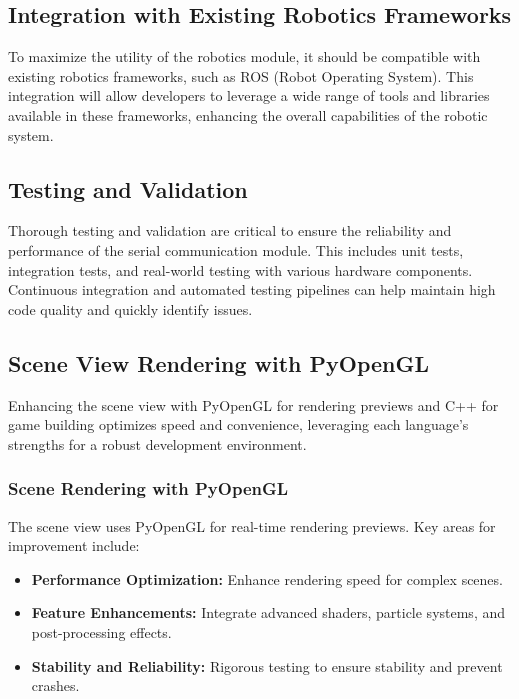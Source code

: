 \subsection*{Integration with Existing Robotics Frameworks}

To maximize the utility of the robotics module, it should be compatible with existing robotics frameworks, such as ROS (Robot Operating System). This integration will allow developers to leverage a wide range of tools and libraries available in these frameworks, enhancing the overall capabilities of the robotic system.


\subsection*{Testing and Validation}

Thorough testing and validation are critical to ensure the reliability and performance of the serial communication module. This includes unit tests, integration tests, and real-world testing with various hardware components. Continuous integration and automated testing pipelines can help maintain high code quality and quickly identify issues.



\pagebreak


\subsection*{Scene View Rendering with PyOpenGL}

Enhancing the scene view with PyOpenGL for rendering previews and C++ for game building optimizes speed and convenience, leveraging each language's strengths for a robust development environment.

\subsubsection*{Scene Rendering with PyOpenGL}

The scene view uses PyOpenGL for real-time rendering previews. Key areas for improvement include:

\begin{itemize}
    \item \textbf{Performance Optimization:} Enhance rendering speed for complex scenes.
    \item \textbf{Feature Enhancements:} Integrate advanced shaders, particle systems, and post-processing effects.
    \item \textbf{Stability and Reliability:} Rigorous testing to ensure stability and prevent crashes.
\end{itemize}

